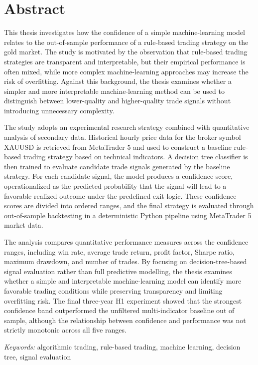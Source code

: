 \chapter*{Abstract}

This thesis investigates how the confidence of a simple machine-learning model
relates to the out-of-sample performance of a rule-based trading strategy on
the gold market. The study is motivated by the observation that rule-based trading
strategies are transparent and interpretable, but their empirical
performance is often mixed, while more complex machine-learning approaches may
increase the risk of overfitting. Against this background, the thesis examines
whether a simpler and more interpretable machine-learning method can be used to
distinguish between lower-quality and higher-quality trade signals without
introducing unnecessary complexity.

The study adopts an experimental research strategy combined with quantitative
analysis of secondary data. Historical hourly price data for the broker symbol
XAUUSD is retrieved from MetaTrader 5 and used to construct a baseline
rule-based trading strategy based on technical indicators. A decision tree
classifier is then trained to evaluate candidate trade signals generated by the
baseline strategy. For each candidate signal, the model produces a confidence
score, operationalized as the predicted probability that the signal will lead
to a favorable realized outcome under the predefined exit logic. These
confidence scores are divided into ordered ranges, and the final strategy is
evaluated through out-of-sample backtesting in a deterministic Python pipeline
using MetaTrader 5 market data.

The analysis compares quantitative performance measures across the confidence
ranges, including win rate, average trade return, profit factor, Sharpe ratio,
maximum drawdown, and number of trades. By focusing on decision-tree-based
signal evaluation rather than full predictive modelling, the thesis examines
whether a simple and interpretable machine-learning model can identify more
favorable trading conditions while preserving transparency and limiting
overfitting risk.
The final three-year H1 experiment showed that the strongest confidence band
outperformed the unfiltered multi-indicator baseline out of sample, although
the relationship between confidence and performance was not strictly monotonic
across all five ranges.
\par\medskip
\thispagestyle{empty}

\emph{Keywords:} algorithmic trading, rule-based trading, machine learning, decision tree, signal evaluation
